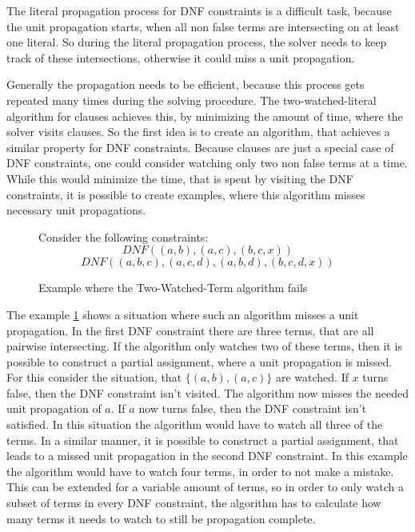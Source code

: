 The literal propagation process for DNF constraints is a difficult task, because the unit propagation starts, when all non false terms are intersecting on at least one literal. So during the literal propagation process, the solver needs to keep track of these intersections, otherwise it could miss a unit propagation. 

Generally the propagation needs to be efficient, because this process gets repeated many times during the solving procedure. The two-watched-literal algorithm for clauses achieves this, by minimizing the amount of time, where the solver visits clauses. So the first idea is to create an algorithm, that achieves a similar property for DNF constraints. Because clauses are just a special case of DNF constraints, one could consider watching only two non false terms at a time. While this would minimize the time, that is spent by visiting the DNF constraints, it is possible to create examples, where this algorithm misses necessary unit propagations.

\begin{figure}[!htb]
\begin{leftbar}
Consider the following constraints:
\begin{displaymath}
DNF ((a,b),(a,c),(b,c,x))
\end{displaymath}
\begin{displaymath}
DNF ((a,b,c),(a,c,d),(a,b,d),(b,c,d,x))
\end{displaymath}
\end{leftbar}
\caption{Example where the Two-Watched-Term algorithm fails}
\label{ex:NotPropagationComplete}
\end{figure}

The example \ref{ex:NotPropagationComplete} shows a situation where such an algorithm misses a unit propagation. In the first DNF constraint there are three terms, that are all pairwise intersecting. If the algorithm only watches two of these terms, then it is possible to construct a partial assignment, where a unit propagation is missed. For this consider the situation, that $\{(a,b),(a,c)\}$ are watched. If $x$ turns false, then the DNF constraint isn't visited. The algorithm now misses the needed unit propagation of $a$. If $a$ now turns false, then the DNF constraint isn't satisfied. In this situation the algorithm would have to watch all three of the terms.
In a similar manner, it is possible to construct a partial assignment, that leads to a missed unit propagation in the second DNF constraint. In this example the algorithm would have to watch four terms, in order to not make a mistake. This can be extended for a variable amount of terms, so in order to only watch a subset of terms in every DNF constraint, the algorithm has to calculate how many terms it needs to watch to still be propagation complete. 


